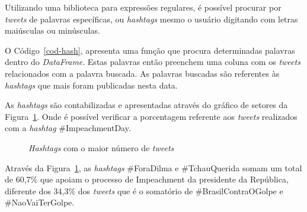 Utilizando uma biblioteca para expressões regulares, é possível procurar por \textit{tweets} de palavras específicas, ou \textit{hashtags} mesmo o usuário digitando com letras maiúsculas ou minúsculas.

O Código~\ref{cod-hash}, apresenta uma função que procura determinadas palavras dentro do \textit{DataFrame}. Estas palavras então preenchem uma coluna com os \textit{tweets} relacionados com a palavra buscada. As palavras buscadas são referentes às \textit{hashtags} que mais foram publicadas nesta data.



As \textit{hashtags} são contabilizadas e apresentadas através do gráfico de setores da Figura~\ref{hashtag}. Onde é possível verificar a porcentagem referente aos \textit{tweets} realizados com a \textit{hashtag} \#ImpeachmentDay. 

\begin{figure}[h]
	\centering
	\caption{\textit{Hashtags} com o maior número de \textit{tweets}}
	\vspace{-0.3cm}
	\label{hashtag}
\end{figure}

Através da Figura~\ref{hashtag}, as \textit{hashtags} \#ForaDilma e \#TchauQuerida somam um total de 60,7\% que apoiam o processo de Impeachment  da presidente da República, diferente dos 34,3\% dos \textit{tweets} que é o somatório de \#BrasilContraOGolpe e \#NaoVaiTerGolpe.

